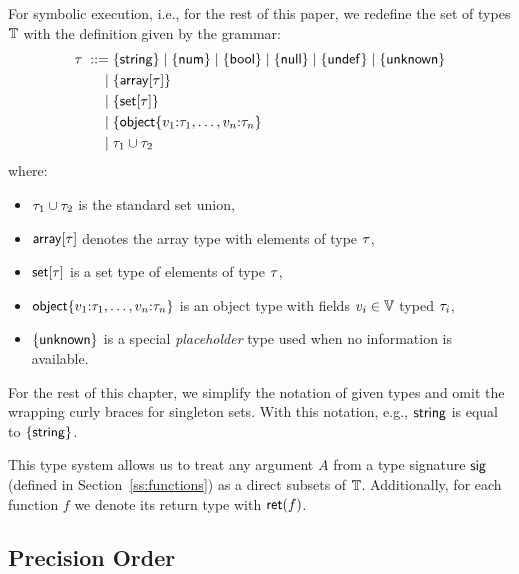 For symbolic execution, i.e., for the rest of this paper, we redefine the set of \rego types $\mathbb{T}$ with the definition given by the grammar:
\begin{align*}
  \tau \;::=\; & \{\mathsf{string}\} \mid \{\mathsf{num}\} \mid \{\mathsf{bool}\} \mid \{\mathsf{null}\} \mid \{\mathsf{undef}\} \mid \{\mathsf{unknown}\} \\
   \mid\;   & \{\mathsf{array}[{\tau}]\} \\
   \mid\;   & \{\mathsf{set}[{\tau}]\} \\
   \mid\;   & \{\mathsf{object}\{v_1{:}\tau_1,\ldots,v_n{:}\tau_n\} \\
   \mid\;   & \tau_1 \cup \tau_2
\end{align*}
where:
\begin{itemize}
  \item $\tau_1 \cup \tau_2$ is the standard set union,
  \item $\mathsf{array}[{\tau}]$ denotes the array type with elements of type $\tau$,
  \item $\mathsf{set}[{\tau}]$ is a \rego set type of elements of type $\tau$,
  \item $\mathsf{object}\{v_1{:}\tau_1,\ldots,v_n{:}\tau_n\}$ is an object type with fields $v_i \in \mathbb{V}$ typed $\tau_i$,
  \item $\{\mathsf{unknown}\}$ is a special \emph{placeholder} type used when no information is available.
\end{itemize}

For the rest of this chapter, we simplify the notation of given types and omit the wrapping curly braces for singleton sets.
With this notation, e.g., $\mathsf{string}$ is equal to $\{\mathsf{string}\}$.

This type system allows us to treat any argument $A$ from a type signature $\mathsf{sig}$ (defined in Section~\ref{ss:functions}) as a direct subsets of $\mathbb{T}$.
Additionally, for each function $f$ we denote its return type with $\mathsf{ret}(f)$.

\subsection{Precision Order}

